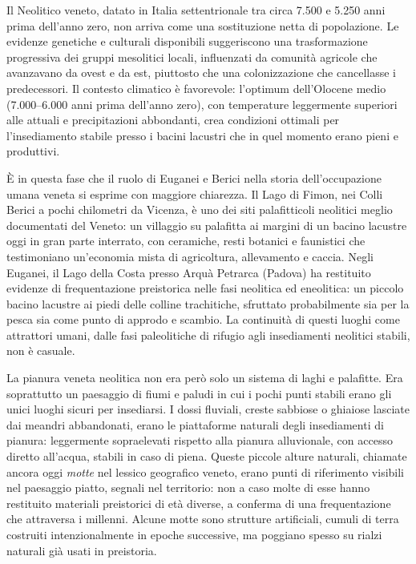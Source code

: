 Il Neolitico veneto, datato in Italia settentrionale tra circa 7.500 e 5.250 anni prima dell'anno zero, non arriva come una sostituzione netta di popolazione. Le evidenze genetiche e culturali disponibili suggeriscono una trasformazione progressiva dei gruppi mesolitici locali, influenzati da comunità agricole che avanzavano da ovest e da est, piuttosto che una colonizzazione che cancellasse i predecessori. Il contesto climatico è favorevole: l'optimum dell'Olocene medio (7.000--6.000 anni prima dell'anno zero), con temperature leggermente superiori alle attuali e precipitazioni abbondanti, crea condizioni ottimali per l'insediamento stabile presso i bacini lacustri che in quel momento erano pieni e produttivi.

È in questa fase che il ruolo di Euganei e Berici nella storia dell'occupazione umana veneta si esprime con maggiore chiarezza. Il Lago di Fimon, nei Colli Berici a pochi chilometri da Vicenza, è uno dei siti palafitticoli neolitici meglio documentati del Veneto: un villaggio su palafitta ai margini di un bacino lacustre oggi in gran parte interrato, con ceramiche, resti botanici e faunistici che testimoniano un'economia mista di agricoltura, allevamento e caccia. Negli Euganei, il Lago della Costa presso Arquà Petrarca (Padova) ha restituito evidenze di frequentazione preistorica nelle fasi neolitica ed eneolitica: un piccolo bacino lacustre ai piedi delle colline trachitiche, sfruttato probabilmente sia per la pesca sia come punto di approdo e scambio. La continuità di questi luoghi come attrattori umani, dalle fasi paleolitiche di rifugio agli insediamenti neolitici stabili, non è casuale.

La pianura veneta neolitica non era però solo un sistema di laghi e palafitte. Era soprattutto un paesaggio di fiumi e paludi in cui i pochi punti stabili erano gli unici luoghi sicuri per insediarsi. I dossi fluviali, creste sabbiose o ghiaiose lasciate dai meandri abbandonati, erano le piattaforme naturali degli insediamenti di pianura: leggermente sopraelevati rispetto alla pianura alluvionale, con accesso diretto all'acqua, stabili in caso di piena. Queste piccole alture naturali, chiamate ancora oggi \textit{motte} nel lessico geografico veneto, erano punti di riferimento visibili nel paesaggio piatto, segnali nel territorio: non a caso molte di esse hanno restituito materiali preistorici di età diverse, a conferma di una frequentazione che attraversa i millenni. Alcune motte sono strutture artificiali, cumuli di terra costruiti intenzionalmente in epoche successive, ma poggiano spesso su rialzi naturali già usati in preistoria.

